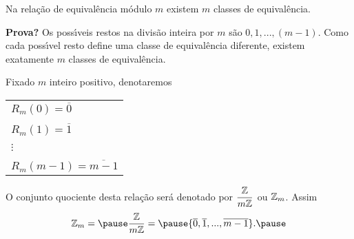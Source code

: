 \documentclass{beamer}
\begin{document}
    \begin{frame}    
        \begin{proposicao}
            Na rela{\c c}{\~a}o de equival{\^e}ncia m{\'o}dulo $m$ existem $m$ classes de equival{\^e}ncia.\pause
        \end{proposicao}
        \noindent \textbf{Prova?}
            Os poss{\'\i}veis restos na divis{\~a}o inteira por $m$ \pause s{\~a}o $0,1,...,(m-1)$. \pause Como cada poss{\'\i}vel resto define uma classe de equival{\^e}ncia diferente, \pause existem exatamente $m$ classes de equival{\^e}ncia.\hspace{.5cm}\qedsymbol\pause
    \end{frame}

    \begin{frame}
        \begin{observacao}
        Fixado $m$ inteiro positivo, \pause denotaremos\pause
        \begin{center}
            \begin{tabular}{l}
                $R_{m}(0) = \overline{0}$\pause \\
                \\
                $R_{m}(1) = \overline{1}$\pause \\
                \\
                $\vdots$\\
                \\
                $R_{m}(m-1) = \overline{m-1}$\pause
            \end{tabular}
        \end{center}

        O conjunto quociente \pause desta rela{\c c}{\~a}o ser{\'a} denotado por $\displaystyle\frac{\mathbb{Z}}{m\mathbb{Z}}$ \pause ou $\mathbb{Z}_m$. \pause Assim\pause
        \[
            \z_m = \pause \displaystyle\frac{\z}{m\z} = \pause \{\overline{0},\overline{1},...,\overline{m-1}\}.\pause
        \]
        \end{observacao}
    \end{frame}
\end{document}

